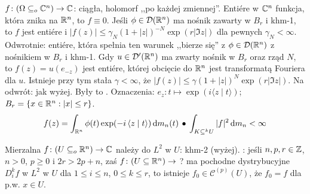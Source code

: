   $f \colon (\Omega \subseteq_o \mathbb{C}^n) \to \mathbb{C}$: ciągła, holomorf ,,po każdej zmiennej''.
Entiére w $\mathbb{C}^n$ funkcja, która znika na $\mathbb{R}^n$, to $f \equiv 0$.
Jeśli $\phi \in \mathcal D(\mathbb{R}^n)$ ma nośnik zawarty w $B_r$ i khm-1, to $f$ jest entiére i $|f(z)| \le \gamma_N (1+|z|)^{-N} \exp(r |\Im z|)$ dla pewnych $\gamma_N < \infty$.
Odwrotnie: entiére, która spełnia ten warunek ,,bierze się'' z $\phi \in \mathcal D(\mathbb{R}^n)$ z nośnikiem w $B_r$ i khm-1.
Gdy $u \in \mathcal D'(\mathbb{R}^n)$ ma zwarty nośnik w $B_r$ oraz rząd $N$, to $f(z) = u(e_{-z})$ jest entiére, której obcięcie do $\mathbb{R}^n$ jest transformatą Fouriera dla $u$.
Istnieje przy tym stała $\gamma < \infty$, że $|f(z)| \le \gamma(1+|z|)^N \exp (r |\Im z|)$.
Na odwrót: jak wyżej.
Były to .
Oznaczenia: $e_z \colon t \mapsto \exp (i \langle z \mid t \rangle)$; $B_r = \{x \in \mathbb{R}^n : |x| \le r\}$.
\[
	f(z) = \int_{\mathbb{R}^n} \phi(t) \exp(-i \,\langle z \mid t \rangle) \,\textrm{d} m_n(t) \, \bullet \,
	\int_{K \subseteq^k U} |f|^2 \,\textrm{d}m_n < \infty
\]

Mierzalna  $f \colon (U \subseteq_o \mathbb{R}^n) \to \mathbb{C}$ należy  do $L^2$ w $U$: khm-2 (wyżej).
: jeśli $n, p, r \in \mathbb{Z}$, $n > 0$, $p \ge 0$ i $2r > 2p + n$, zaś $f \colon (U \subseteq \mathbb{R}^n) \to$ ? ma pochodne dystrybucyjne $D_i^kf$ w $L^2$ w $U$ dla $1 \le i \le n$, $0 \le k \le r$, to istnieje $f_0 \in \mathscr C^{(p)}(U)$, że $f_0 = f$ dla p.w. $x \in U$.

